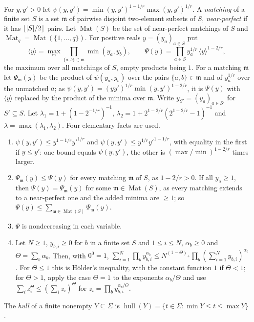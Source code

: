 For $y,y'>0$ let $\psi(y,y')=\min(y,y')^{1-1/r}\max(y,y')^{1/r}$. A \emph{matching} of a finite set $S$ is a set
$\mathfrak m$ of pairwise disjoint two-element subsets of $S$, \emph{near-perfect} if it has $\lfloor\lvert S\rvert/2\rfloor$
pairs. Let $\operatorname{Mat}(S)$ be the set of near-perfect matchings of $S$ and
$\operatorname{Mat}_q=\operatorname{Mat}(\{1,\dots,q\})$. For positive reals $y=(y_a)_{a\in S}$ put
\[
 \langle y\rangle=\max_{\mathfrak m}\prod_{\{a,b\}\in\mathfrak m}\min(y_a,y_b),\qquad
 \Psi(y)=\prod_{a\in S}y_a^{1/r}\,\langle y\rangle^{1-2/r},
\]
the maximum over all matchings of $S$, empty products being $1$. For a matching $\mathfrak m$ let
$\Psi_{\mathfrak m}(y)$ be the product of $\psi(y_a,y_b)$ over the pairs $\{a,b\}\in\mathfrak m$ and of $y_a^{1/r}$ over
the unmatched $a$; as $\psi(y,y')=(yy')^{1/r}\min(y,y')^{1-2/r}$, it is $\Psi(y)$ with $\langle y\rangle$ replaced by the
product of the minima over $\mathfrak m$. Write $y_{S'}=(y_a)_{a\in S'}$ for $S'\subseteq S$. Let
$\lambda_1=1+(1-2^{-1/r})^{-1}$, $\lambda_2=1+2^{1-2/r}(2^{1-2/r}-1)^{-1}$ and $\lambda=\max(\lambda_1,\lambda_2)$. Four
elementary facts are used.
\begin{enumerate}
\item[(F1)] $\psi(y,y')\le y^{1-1/r}y'^{1/r}$ and $\psi(y,y')\le y^{1/r}y'^{1-1/r}$, with equality in the first if
$y\le y'$: one bound equals $\psi(y,y')$, the other is $(\max/\min)^{1-2/r}$ times larger.
\item[(F2)] $\Psi_{\mathfrak m}(y)\le\Psi(y)$ for every matching $\mathfrak m$ of $S$, as $1-2/r>0$. If all $y_a\ge1$, then
$\Psi(y)=\Psi_{\mathfrak m}(y)$ for some $\mathfrak m\in\operatorname{Mat}(S)$, as every matching extends to a
near-perfect one and the added minima are $\ge1$; so $\Psi(y)\le\sum_{\mathfrak m\in\operatorname{Mat}(S)}\Psi_{\mathfrak m}(y)$.
\item[(F3)] $\Psi$ is nondecreasing in each variable.
\item[(F4)] Let $N\ge1$, $y_{b,i}\ge0$ for $b$ in a finite set $S$ and $1\le i\le N$, $\alpha_b\ge0$ and
$\Theta=\sum_b\alpha_b$. Then, with $0^0=1$,
$\sum_{i=1}^N\prod_by_{b,i}^{\alpha_b}\le N^{(1-\Theta)_+}\prod_b(\sum_{i=1}^Ny_{b,i})^{\alpha_b}$. For $\Theta\le1$ this
is H\"older's inequality, with the constant function $1$ if $\Theta<1$; for $\Theta>1$, apply the case $\Theta=1$ to
the exponents $\alpha_b/\Theta$ and use $\sum_iz_i^\Theta\le(\sum_iz_i)^\Theta$ for $z_i=\prod_by_{b,i}^{\alpha_b/\Theta}$.
\end{enumerate}
The \emph{hull} of a finite nonempty $Y\subseteq\Sigma$ is $\operatorname{hull}(Y)=\{t\in\Sigma:\min Y\le t\le\max Y\}$.

